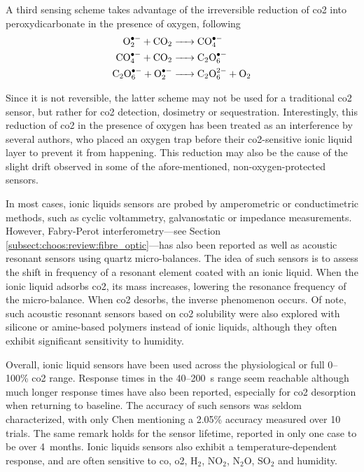 A third sensing scheme takes advantage of the irreversible reduction of \gls{co2} into peroxydicarbonate in the presence of oxygen, following\cite{buzzeo2004, xiao2013}
\begin{equation}
	\begin{aligned}
		\ce{O^{.-}_2 + CO_2 &-> CO^{. -}_4 } \\
		\ce{CO^{.-}_4 + CO_2 &-> C_2O^{. -}_6 } \\
		\ce{C_2O^{.-}_6 + O^{. -}_2 &-> C_2O^{2-}_6 + O_2}
	\end{aligned}
\end{equation}

Since it is not reversible, the latter scheme may not be used for a traditional \gls{co2} sensor, but rather for \gls{co2} detection, dosimetry or sequestration. Interestingly, this reduction of \gls{co2} in the presence of oxygen has been treated as an interference by several authors\cite{revsbech2019, fapyane2020}, who placed an oxygen trap before their \gls{co2}-sensitive ionic liquid layer to prevent it from happening. This reduction may also be the cause of the slight drift observed in some of the afore-mentioned, non-oxygen-protected sensors\cite{li2012, willa2015, willa2017}.

In most cases, ionic liquids sensors are probed by amperometric or conductimetric methods, such as cyclic voltammetry, galvanostatic or impedance measurements. However, Fabry-Perot interferometry---see Section \ref{subsect:choos:review:fibre_optic}---has also been reported\cite{wu2018} as well as acoustic resonant sensors using quartz micro-balances\cite{mineo2012, xiao2013}. The idea of such sensors is to assess the shift in frequency of a resonant element coated with an ionic liquid. When the ionic liquid adsorbs \gls{co2}, its mass increases, lowering the resonance frequency of the micro-balance. When \gls{co2} desorbs, the inverse phenomenon occurs. Of note, such acoustic resonant sensors based on \gls{co2} solubility were also explored with silicone or amine-based polymers instead of ionic liquids\cite{zhou1994, gomes1995, lee2012, hoffman2017, siefker2021}, although they often exhibit significant sensitivity to humidity.

Overall, ionic liquid sensors have been used across the physiological\cite{fapyane2020} or full 0--100\%\cite{rosen2010, mineo2012} \gls{co2} range. Response times in the 40--200~s range seem reachable\cite{chen2011, mineo2012, fapyane2020} although much longer response times have also been reported, especially for \gls{co2} desorption when returning to baseline\cite{ishizu2013, willa2015, willa2017}. The accuracy of such sensors was seldom characterized, with only Chen \etal{}\cite{chen2011} mentioning a 2.05\% accuracy measured over 10 trials. The same remark holds for the sensor lifetime, reported in only one case to be over 4~months\cite{fapyane2020}. Ionic liquids sensors also exhibit a temperature-dependent response\cite{revsbech2019, fapyane2020}, and are often sensitive to \gls{co}, \gls{o2}, H$_2$, NO$_2$, N$_2$O, SO$_2$ and humidity\cite{chen2011, li2012, fapyane2020}.

